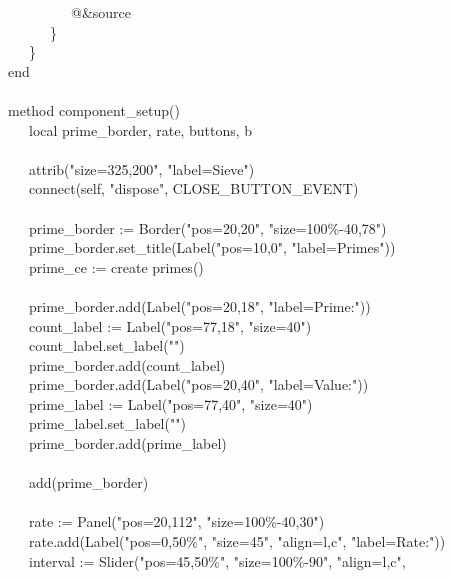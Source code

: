 {\>   \ \ \ \ \ \ \ \ \ @\&source \\
\>   \ \ \ \ \ \ \} \\
\>   \ \ \ \} \\
\>   end \\
\ \\
\>   method component\_setup() \\
\>   \ \ \ local prime\_border, rate, buttons, b \\
\ \\
\>   \ \ \ attrib("size=325,200",
"label=Sieve") \\
\>   \ \ \ connect(self, "dispose",
CLOSE\_BUTTON\_EVENT) \\
\ \\
\>   \ \ \ prime\_border :=
Border("pos=20,20",
"size=100\%-40,78") \\
\>   \ \ \ prime\_border.set\_title(Label("pos=10,0",
"label=Primes")) \\
\>   \ \ \ prime\_ce := create primes() \\
\ \\
\>   \ \ \ prime\_border.add(Label("pos=20,18",
"label=Prime:")) \\
\>   \ \ \ count\_label :=
Label("pos=77,18",
"size=40") \\
\>   \ \ \ count\_label.set\_label("") \\
\>   \ \ \ prime\_border.add(count\_label) \\
\>   \ \ \ prime\_border.add(Label("pos=20,40",
"label=Value:")) \\
\>   \ \ \ prime\_label :=
Label("pos=77,40",
"size=40") \\
\>   \ \ \ prime\_label.set\_label("") \\
\>   \ \ \ prime\_border.add(prime\_label) \\
\ \\
\>   \ \ \ add(prime\_border) \\
\ \\
\>   \ \ \ rate := Panel("pos=20,112",
"size=100\%-40,30") \\
\>   \ \ \ rate.add(Label("pos=0,50\%",
"size=45",
"align=l,c",
"label=Rate:")) \\
\>   \ \ \ interval := Slider("pos=45,50\%", "size=100\%-90", "align=l,c", \\

}
